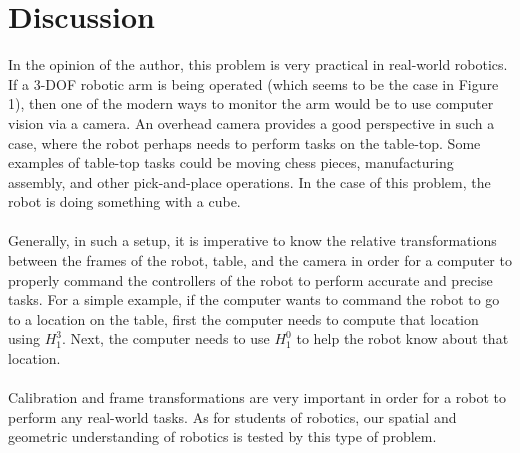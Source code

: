 \documentclass[conference]{IEEEtran}
\begin{document}
\section{Discussion}
In the opinion of the author, this problem is very practical
in real-world robotics. If a 3-DOF robotic arm is being operated
(which seems to be the case in Figure 1), then one of the modern 
ways to monitor the arm would be to use computer vision via a camera.
An overhead camera provides a good perspective in such a case, where
the robot perhaps needs to perform tasks on the table-top. Some examples
of table-top tasks could be moving chess pieces, manufacturing assembly,
and other pick-and-place operations. In the case of this problem, the
robot is doing something with a cube.\\
\vspace{0in}\\
Generally, in such a setup, it is imperative to know the relative transformations
between the frames of the robot, table, and the camera in order for a computer
to properly command the controllers of the robot to perform accurate and precise
tasks. For a simple example, if the computer wants to command the robot to go
to a location on the table, first the computer needs to compute that location using
$H^3_1$. Next, the computer needs to use $H^0_1$ to help the robot know about
that location.\\
\vspace{0in}\\
Calibration and frame transformations are very important in order for a robot
to perform any real-world tasks. As for students of robotics, our spatial and
geometric understanding of robotics is tested by this type of problem.


\end{document}
